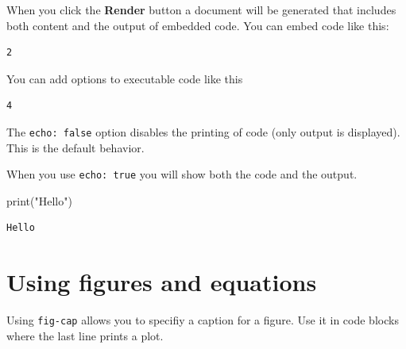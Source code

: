 \documentclass[
  number,
  preprint,
  3p,
  twocolumn]{elsarticle}
\newenvironment{Shaded}{\begin{snugshade}}{\end{snugshade}}
\newcommand{\BuiltInTok}[1]{\textcolor[rgb]{0.00,0.23,0.31}{#1}}
\newcommand{\NormalTok}[1]{\textcolor[rgb]{0.00,0.23,0.31}{#1}}
\newcommand{\StringTok}[1]{\textcolor[rgb]{0.13,0.47,0.30}{#1}}
\begin{document}
When you click the \textbf{Render} button a document will be generated
that includes both content and the output of embedded code. You can
embed code like this:

\begin{verbatim}
2
\end{verbatim}

You can add options to executable code like this

\begin{verbatim}
4
\end{verbatim}

The \texttt{echo:\ false} option disables the printing of code (only
output is displayed). This is the default behavior.

When you use \texttt{echo:\ true} you will show both the code and the
output.

\begin{Shaded}
\begin{Highlighting}[]
\BuiltInTok{print}\NormalTok{(}\StringTok{"Hello"}\NormalTok{)}
\end{Highlighting}
\end{Shaded}

\begin{verbatim}
Hello
\end{verbatim}

\section{Using figures and equations}\label{using-figures-and-equations}

Using \texttt{fig-cap} allows you to specifiy a caption for a figure.
Use it in code blocks where the last line prints a plot.
\end{document}
